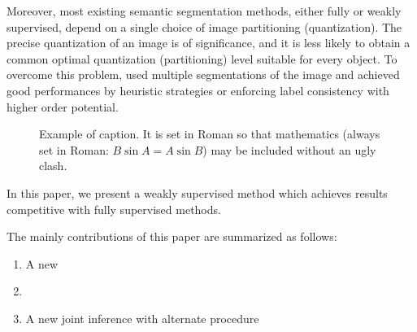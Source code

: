 Moreover, most existing semantic segmentation methods, either fully or weakly supervised, depend on a single choice of image partitioning (quantization). The precise quantization of an image is of significance, and it is less likely to obtain a common optimal quantization (partitioning) level suitable for every object. To overcome this problem, \cite{hoiem2005geometric,kohli2009robust,ladicky2009associative,nowozin2010parameter,russell2006using} used multiple segmentations of the image and achieved good performances by heuristic strategies or enforcing label consistency with higher order potential.
\fi

\begin{figure}[t]
\begin{center}
\fbox{\rule{0pt}{2in} \rule{0.9\linewidth}{0pt}}
\end{center}
   \caption{Example of caption.  It is set in Roman so that mathematics
   (always set in Roman: $B \sin A = A \sin B$) may be included without an
   ugly clash.}
\label{fig:noisylabel}
\end{figure}

In this paper, we present a weakly supervised method which achieves results competitive with fully supervised methods.

The mainly contributions of this paper are summarized as follows:
\begin{enumerate}
  \item A new
  \item
  \item A new joint inference with alternate procedure
\end{enumerate}
